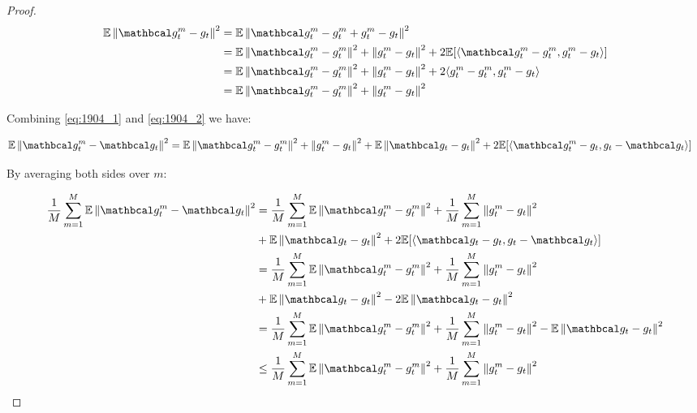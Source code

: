 \begin{proof}
    \begin{align}
        \E \norm{\mc{g}^m_t - g_t}^2 
        &= \E \norm{\mc{g}^m_t - g^m_t + g^m_t - g_t}^2 \\
        &= \E \norm{\mc{g}^m_t - g^m_t}^2 
        + \norm{g^m_t - g_t}^2
        + 2\E[\inner{\mc{g}^m_t - g^m_t}{g^m_t - g_t}] \\
        &= \E \norm{\mc{g}^m_t - g^m_t}^2 
        + \norm{g^m_t - g_t}^2
        + 2 \inner{g^m_t - g^m_t}{g^m_t - g_t} \\
        &= \E \norm{\mc{g}^m_t - g^m_t}^2 
        + \norm{g^m_t - g_t}^2 \label{eq:1904_2}
    \end{align}

    Combining \eqref{eq:1904_1} and \eqref{eq:1904_2} we have:

    \begin{align}
        \E \norm{\mc{g}^m_t - \mc{g}_t}^2
        &= \E \norm{\mc{g}^m_t - g^m_t}^2 
        + \norm{g^m_t - g_t}^2 + \E \norm{\mc{g}_t - g_t}^2 + 2\E [\inner{\mc{g}^m_t - g_t}{g_t - \mc{g}_t}]
    \end{align}

    By averaging both sides over $m$:

    \begin{align}
        \fsumm{m=1}{M} \E \norm{\mc{g}^m_t - \mc{g}_t}^2
        &= \fsumm{m=1}{M} \E \norm{\mc{g}^m_t - g^m_t}^2 
        + \fsumm{m=1}{M} \norm{g^m_t - g_t}^2 \\
        &+ \E \norm{\mc{g}_t - g_t}^2 
        + 2\E [\inner{\mc{g}_t - g_t}{g_t - \mc{g}_t}] \\
        &= \fsumm{m=1}{M} \E \norm{\mc{g}^m_t - g^m_t}^2 
        + \fsumm{m=1}{M} \norm{g^m_t - g_t}^2 \\
        &+ \E \norm{\mc{g}_t - g_t}^2 
        - 2\E \norm{\mc{g}_t - g_t}^2 \\
        &= \fsumm{m=1}{M} \E \norm{\mc{g}^m_t - g^m_t}^2 
        + \fsumm{m=1}{M} \norm{g^m_t - g_t}^2
        - \E \norm{\mc{g}_t - g_t}^2 \\
        &\leq \fsumm{m=1}{M} \E \norm{\mc{g}^m_t - g^m_t}^2 
        + \fsumm{m=1}{M} \norm{g^m_t - g_t}^2 \label{eq:1904_3}
    \end{align}


\end{proof}
